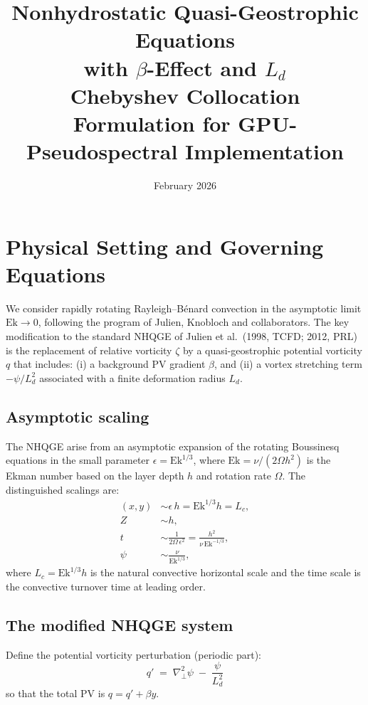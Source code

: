 \documentclass[11pt]{article}
\title{\textbf{Nonhydrostatic Quasi-Geostrophic Equations\\[4pt]
with $\beta$-Effect and $L_d$}\\[8pt]
\large Chebyshev Collocation Formulation for GPU-Pseudospectral Implementation}
\author{}
\date{February 2026}
\newcommand{\Ek}{\mathrm{Ek}}
\newcommand{\Ld}{L_d}
\newcommand{\Lc}{L_c}
\begin{document}
\maketitle
\vspace{1em}

\section{Physical Setting and Governing Equations}

We consider rapidly rotating Rayleigh--B\'enard convection in the asymptotic limit $\Ek \to 0$, following the program of Julien, Knobloch and collaborators. The key modification to the standard NHQGE of Julien et al.\ (1998, TCFD; 2012, PRL) is the replacement of relative vorticity $\zeta$ by a quasi-geostrophic potential vorticity $q$ that includes: (i) a background PV gradient $\beta$, and (ii) a vortex stretching term $-\psi/\Ld^2$ associated with a finite deformation radius $\Ld$.

\subsection{Asymptotic scaling}

The NHQGE arise from an asymptotic expansion of the rotating Boussinesq equations in the small parameter $\epsilon = \Ek^{1/3}$, where $\Ek = \nu/(2\Omega h^2)$ is the Ekman number based on the layer depth $h$ and rotation rate $\Omega$. The distinguished scalings are:
\begin{align}
(x,y) &\sim \epsilon\, h = \Ek^{1/3} h = \Lc, \\
Z &\sim h, \\
t &\sim \frac{1}{2\Omega\,\epsilon^2} = \frac{h^2}{\nu\,\Ek^{-1/3}},\\
\psi &\sim \frac{\nu}{\Ek^{1/3}},
\end{align}
where $\Lc = \Ek^{1/3}h$ is the natural convective horizontal scale and the time scale is the convective turnover time at leading order.

\subsection{The modified NHQGE system}

Define the potential vorticity perturbation (periodic part):
\begin{equation}
\boxed{q' \;=\; \nabla_\perp^2\psi \;-\; \frac{\psi}{\Ld^2}}
\label{eq:pv_def}
\end{equation}
so that the total PV is $q = q' + \beta y$.
\end{document}
